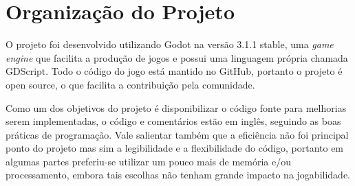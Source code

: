 \section{Organização do Projeto}
\label{sec:consideracoes_preliminares}

O projeto foi desenvolvido utilizando Godot na versão 3.1.1 stable, 
uma \textit{game engine} que facilita a produção de jogos e possui uma linguagem
própria chamada GDScript.
Todo o código do jogo está mantido no GitHub, portanto o projeto é open source,
o que facilita a contribuição pela comunidade.

Como um dos objetivos do projeto é disponibilizar o código fonte para
melhorias serem implementadas, o código e comentários estão em inglês, seguindo
as boas práticas de programação. Vale salientar também que a eficiência não foi
principal ponto do projeto mas sim a legibilidade e a flexibilidade do 
código, portanto em algumas partes preferiu-se utilizar um pouco mais de memória
e/ou processamento, embora tais escolhas não tenham grande impacto na jogabilidade.




